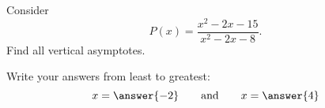 \documentclass{ximera}
\author{Bart Snapp}
\begin{document}
\begin{exercise}
Consider 
\[P(x) = \frac{x^2-2 x-15}{x^2-2 x-8}.
\]
Find all vertical asymptotes.
\begin{prompt}
\begin{multipleChoice}
\end{multipleChoice}
\begin{exercise}Write your answers from least to greatest:
\[
x=\answer{-2}\qquad\text{and}\qquad x=\answer{4}
\]
\end{exercise}
\end{prompt}
\end{exercise}
\end{document}
